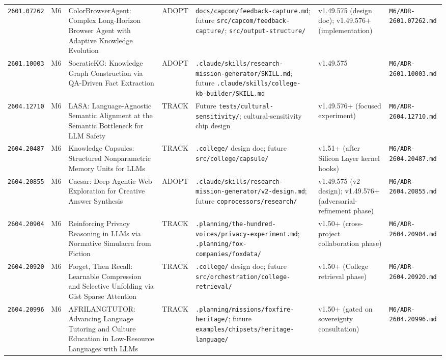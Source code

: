 \documentclass[11pt,letterpaper]{article}
\newcommand{\arxivid}[1]{\texttt{\textcolor{accent}{#1}}}
\begin{document}
\begin{footnotesize}
\begin{longtable}{@{}L{0.10\textwidth} L{0.025\textwidth} L{0.22\textwidth} L{0.06\textwidth} L{0.20\textwidth} L{0.13\textwidth} L{0.13\textwidth}@{}}
\arxivid{2601.07262} & M6 & ColorBrowserAgent: Complex Long-Horizon Browser Agent with Adaptive Knowledge Evolution & ADOPT & \texttt{docs/capcom/feedback-capture.md}; future \texttt{src/capcom/feedback-capture/}; \texttt{src/output-structure/} & v1.49.575 (design doc); v1.49.576+ (implementation) & \texttt{\small M6/ADR-2601.07262.md} \\
\arxivid{2601.10003} & M6 & SocraticKG: Knowledge Graph Construction via QA-Driven Fact Extraction & ADOPT & \texttt{.claude/skills/research-mission-generator/SKILL.md}; future \texttt{.claude/skills/college-kb-builder/SKILL.md} & v1.49.575 & \texttt{\small M6/ADR-2601.10003.md} \\
\arxivid{2604.12710} & M6 & LASA: Language-Agnostic Semantic Alignment at the Semantic Bottleneck for LLM Safety & TRACK & Future \texttt{tests/cultural-sensitivity/}; cultural-sensitivity chip design & v1.49.576+ (focused experiment) & \texttt{\small M6/ADR-2604.12710.md} \\
\arxivid{2604.20487} & M6 & Knowledge Capsules: Structured Nonparametric Memory Units for LLMs & TRACK & \texttt{.college/} design doc; future \texttt{src/college/capsule/} & v1.51+ (after Silicon Layer kernel hooks) & \texttt{\small M6/ADR-2604.20487.md} \\
\arxivid{2604.20855} & M6 & Caesar: Deep Agentic Web Exploration for Creative Answer Synthesis & ADOPT & \texttt{.claude/skills/research-mission-generator/v2-design.md}; future \texttt{coprocessors/research/} & v1.49.575 (v2 design); v1.49.576+ (adversarial-refinement phase) & \texttt{\small M6/ADR-2604.20855.md} \\
\arxivid{2604.20904} & M6 & Reinforcing Privacy Reasoning in LLMs via Normative Simulacra from Fiction & TRACK & \texttt{.planning/the-hundred-voices/privacy-experiment.md}; \texttt{.planning/fox-companies/foxdata/} & v1.50+ (cross-project collaboration phase) & \texttt{\small M6/ADR-2604.20904.md} \\
\arxivid{2604.20920} & M6 & Forget, Then Recall: Learnable Compression and Selective Unfolding via Gist Sparse Attention & TRACK & \texttt{.college/} design doc; future \texttt{src/orchestration/college-retrieval/} & v1.50+ (College retrieval phase) & \texttt{\small M6/ADR-2604.20920.md} \\
\arxivid{2604.20996} & M6 & AFRILANGTUTOR: Advancing Language Tutoring and Culture Education in Low-Resource Languages with LLMs & TRACK & \texttt{.planning/missions/foxfire-heritage/}; future \texttt{examples/chipsets/heritage-language/} & v1.50+ (gated on sovereignty consultation) & \texttt{\small M6/ADR-2604.20996.md} \\

\end{longtable}
\end{footnotesize}
\end{document}
